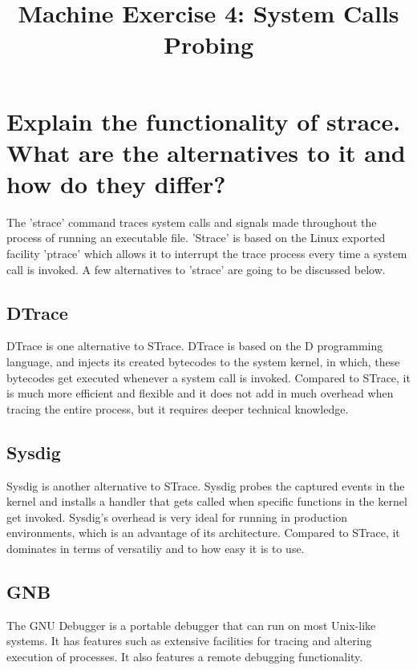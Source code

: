 \documentclass[conference]{IEEEtran}
\begin{document}
\title{Machine Exercise 4: System Calls Probing\\}

\author{
	}
		
\maketitle

\section{Explain the functionality of strace. What are the alternatives to it and how do
they differ?}
The 'strace' command traces system calls and signals made throughout the process of running an executable file. 'Strace' is based on the Linux exported facility 'ptrace' which allows it to interrupt the trace process every time a system call is invoked. A few alternatives to 'strace' are going to be discussed below.
\subsection{DTrace}
DTrace is one alternative to STrace. DTrace is based on the D programming language, and injects its created bytecodes to the system kernel, in which, these bytecodes get executed whenever a system call is invoked. Compared to STrace, it is much more efficient and flexible  and it does not add in much overhead when tracing the entire process, but it requires deeper technical knowledge.
\subsection{Sysdig}
Sysdig is another alternative to STrace. Sysdig probes the captured events in the kernel and installs a handler that gets called when specific functions in the kernel get invoked. Sysdig's overhead is very ideal for running in production environments, which is an advantage of its architecture. Compared to STrace, it dominates in terms of versatiliy and to how easy it is to use.
\subsection{GNB}
The GNU Debugger is a portable debugger that can run on most Unix-like systems. It has features such as extensive facilities for tracing and altering execution of processes. It also features a remote debugging functionality.
\end{document}

